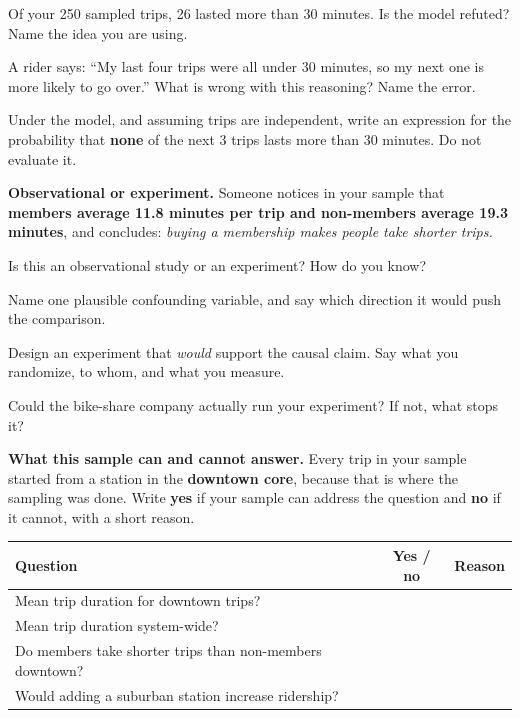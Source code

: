 \documentclass[11pt]{article}
\newcommand{\answerspace}[1]{\vspace{#1}}
\begin{document}
\begin{questions}
\begin{parts}
\item Of your 250 sampled trips, 26 lasted more than 30 minutes. Is the model refuted? Name the
idea you are using.
\answerspace{4.5em}

\item A rider says: ``My last four trips were all under 30 minutes, so my next one is more
likely to go over.'' What is wrong with this reasoning? Name the error.
\answerspace{4em}

\item Under the model, and assuming trips are independent, write an expression for the
probability that \textbf{none} of the next 3 trips lasts more than 30 minutes. Do not evaluate it.
\answerspace{3em}
\end{parts}

\item \textbf{Observational or experiment.} Someone notices in your sample that \textbf{members
average 11.8 minutes per trip and non-members average 19.3 minutes}, and concludes:
\emph{buying a membership makes people take shorter trips.}

\begin{parts}
\item Is this an observational study or an experiment? How do you know?
\answerspace{3em}

\item Name one plausible confounding variable, and say which direction it would push the
comparison.
\answerspace{4.5em}

\item Design an experiment that \emph{would} support the causal claim. Say what you randomize,
to whom, and what you measure.
\answerspace{4.5em}

\item Could the bike-share company actually run your experiment? If not, what stops it?
\answerspace{4em}
\end{parts}

\item \textbf{What this sample can and cannot answer.} Every trip in your sample started from a
station in the \textbf{downtown core}, because that is where the sampling was done. Write
\textbf{yes} if your sample can address the question and \textbf{no} if it cannot, with a short
reason.

\begin{center}
\renewcommand{\arraystretch}{2}
\begin{tabularx}{\linewidth}{Lcp{2in}}
\toprule
\textbf{Question} & \textbf{Yes / no} & \textbf{Reason} \\
\midrule
Mean trip duration for downtown trips? & & \\
Mean trip duration system-wide? & & \\
Do members take shorter trips than non-members downtown? & & \\
Would adding a suburban station increase ridership? & & \\
\bottomrule
\end{tabularx}
\end{center}

\end{questions}
\end{document}

